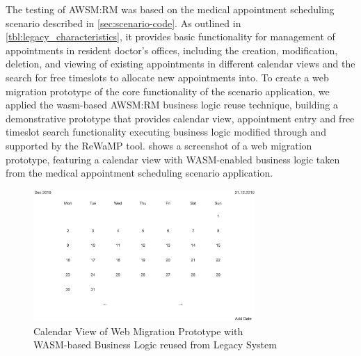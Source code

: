 The testing of AWSM:RM was based on the medical appointment scheduling scenario described in \cref{sec:scenario-code}.
As outlined in \cref{tbl:legacy_characteristics}, it provides basic functionality for management of appointments in resident doctor's offices, including the creation, modification, deletion, and viewing of existing appointments in different calendar views and the search for free timeslots to allocate new appointments into.
To create a \gls{web migration prototype} of the core functionality of the scenario application, we applied the \gls{wasm}-based AWSM:RM business logic reuse technique, building a demonstrative prototype that provides calendar view, appointment entry and free timeslot search functionality executing \legacy business logic modified through and supported by the ReWaMP tool.
 shows a screenshot of a \gls{web migration prototype}, featuring a calendar view with WASM-enabled business logic taken from the medical appointment scheduling scenario application.
\begin{figure}[t]
\hypertarget{fig:eval.rewamp}{%
\centering
\includegraphics[width=0.75\textwidth]{../figures/screenshots/rewamp-calendar.png}
\caption[Calendar View of Web Migration Prototype]{Calendar View of Web Migration Prototype with \\ WASM-based Business Logic reused from Legacy System}\label{fig:eval.rewamp}
}
\end{figure}

